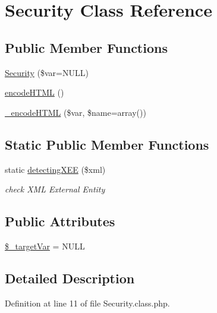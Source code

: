 \hypertarget{classSecurity}{\section{Security Class Reference}
\label{classSecurity}
}
\subsection*{Public Member Functions}
\begin{DoxyCompactItemize}
\item 
\hyperlink{classSecurity_ab74d8099e74ecc760f9328fce70760c7}{Security} (\$var=N\-U\-L\-L)
\item 
\hyperlink{classSecurity_a55da0eb544c3f7eeb6f818578fd0b393}{encode\-H\-T\-M\-L} ()
\item 
\hyperlink{classSecurity_a70d05408553b1e5d0022272d064b5085}{\-\_\-encode\-H\-T\-M\-L} (\$var, \$name=array())
\end{DoxyCompactItemize}
\subsection*{Static Public Member Functions}
\begin{DoxyCompactItemize}
\item 
static \hyperlink{classSecurity_a6de571a78c6e950bdcaf2e61583418a0}{detecting\-X\-E\-E} (\$xml)
\begin{DoxyCompactList}\small\item\em check X\-M\-L External Entity \end{DoxyCompactList}\end{DoxyCompactItemize}
\subsection*{Public Attributes}
\begin{DoxyCompactItemize}
\item 
\hyperlink{classSecurity_a28ff37b08bd7a592552cf5af13f7ac74}{\$\-\_\-target\-Var} = N\-U\-L\-L
\end{DoxyCompactItemize}


\subsection{Detailed Description}


Definition at line 11 of file Security.\-class.\-php.



